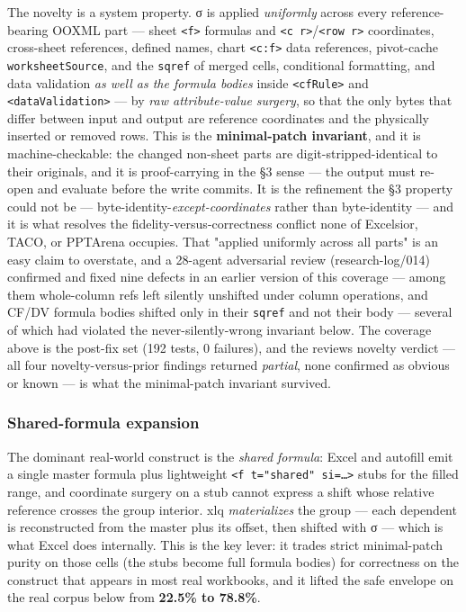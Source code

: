\documentclass[
]{article}
\newcounter{none} %
\begin{document}
The novelty is a system property. σ is applied \emph{uniformly} across
every reference-bearing OOXML part --- sheet
\texttt{\textless{}f\textgreater{}} formulas and
\texttt{\textless{}c\ r\textgreater{}}/\texttt{\textless{}row\ r\textgreater{}}
coordinates, cross-sheet references, defined names, chart
\texttt{\textless{}c:f\textgreater{}} data references, pivot-cache
\texttt{worksheetSource}, and the \texttt{sqref} of merged cells,
conditional formatting, and data validation \emph{as well as the formula
bodies} inside \texttt{\textless{}cfRule\textgreater{}} and
\texttt{\textless{}dataValidation\textgreater{}} --- by \emph{raw
attribute-value surgery}, so that the only bytes that differ between
input and output are reference coordinates and the physically inserted
or removed rows. This is the \textbf{minimal-patch invariant}, and it is
machine-checkable: the changed non-sheet parts are
digit-stripped-identical to their originals, and it is proof-carrying in
the §3 sense --- the output must re-open and evaluate before the write
commits. It is the refinement the §3 property could not be ---
byte-identity-\emph{except-coordinates} rather than byte-identity ---
and it is what resolves the fidelity-versus-correctness conflict none of
Excelsior, TACO, or PPTArena occupies. That "applied uniformly across
all parts" is an easy claim to overstate, and a 28-agent adversarial
review (research-log/014) confirmed and fixed nine defects in an earlier
version of this coverage --- among them whole-column refs left silently
unshifted under column operations, and CF/DV formula bodies shifted only
in their \texttt{sqref} and not their body --- several of which had
violated the never-silently-wrong invariant below. The coverage above is
the post-fix set (192 tests, 0 failures), and the
review\textquotesingle s novelty verdict --- all four
novelty-versus-prior findings returned \emph{partial}, none confirmed as
obvious or known --- is what the minimal-patch invariant survived.

\subsubsection{Shared-formula expansion}\label{shared-formula-expansion}

The dominant real-world construct is the \emph{shared formula}: Excel
and autofill emit a single master formula plus lightweight
\texttt{\textless{}f\ t="shared"\ si=…\textgreater{}} stubs for the
filled range, and coordinate surgery on a stub cannot express a shift
whose relative reference crosses the group interior. xlq
\emph{materializes} the group --- each dependent is reconstructed from
the master plus its offset, then shifted with σ --- which is what Excel
does internally. This is the key lever: it trades strict minimal-patch
purity on those cells (the stubs become full formula bodies) for
correctness on the construct that appears in most real workbooks, and it
lifted the safe envelope on the real corpus below from \textbf{22.5\% to
78.8\%}.
\end{document}
